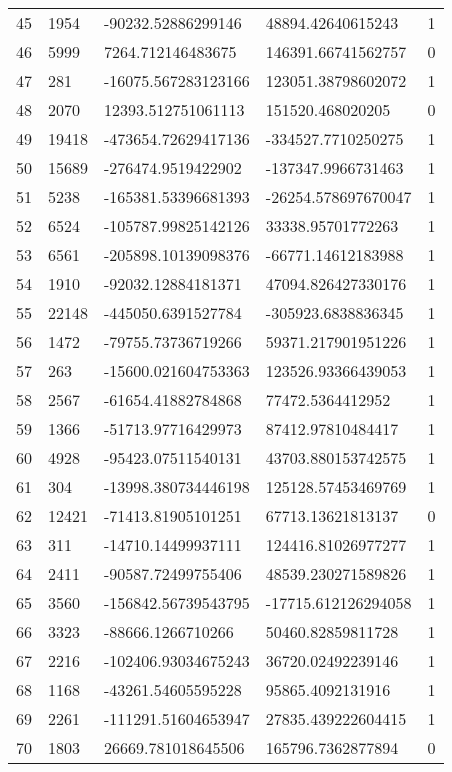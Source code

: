 \begin{longtable}{lllll}
    45 & 1954 & -90232.52886299146 & 48894.42640615243 & 1 \\
    46 & 5999 & 7264.712146483675 & 146391.66741562757 & 0 \\
    47 & 281 & -16075.567283123166 & 123051.38798602072 & 1 \\
    48 & 2070 & 12393.512751061113 & 151520.468020205 & 0 \\
    49 & 19418 & -473654.72629417136 & -334527.7710250275 & 1 \\
    50 & 15689 & -276474.9519422902 & -137347.9966731463 & 1 \\
    51 & 5238 & -165381.53396681393 & -26254.578697670047 & 1 \\
    52 & 6524 & -105787.99825142126 & 33338.95701772263 & 1 \\
    53 & 6561 & -205898.10139098376 & -66771.14612183988 & 1 \\
    54 & 1910 & -92032.12884181371 & 47094.826427330176 & 1 \\
    55 & 22148 & -445050.6391527784 & -305923.6838836345 & 1 \\
    56 & 1472 & -79755.73736719266 & 59371.217901951226 & 1 \\
    57 & 263 & -15600.021604753363 & 123526.93366439053 & 1 \\
    58 & 2567 & -61654.41882784868 & 77472.5364412952 & 1 \\
    59 & 1366 & -51713.97716429973 & 87412.97810484417 & 1 \\
    60 & 4928 & -95423.07511540131 & 43703.880153742575 & 1 \\
    61 & 304 & -13998.380734446198 & 125128.57453469769 & 1 \\
    62 & 12421 & -71413.81905101251 & 67713.13621813137 & 0 \\
    63 & 311 & -14710.14499937111 & 124416.81026977277 & 1 \\
    64 & 2411 & -90587.72499755406 & 48539.230271589826 & 1 \\
    65 & 3560 & -156842.56739543795 & -17715.612126294058 & 1 \\
    66 & 3323 & -88666.1266710266 & 50460.82859811728 & 1 \\
    67 & 2216 & -102406.93034675243 & 36720.02492239146 & 1 \\
    68 & 1168 & -43261.54605595228 & 95865.4092131916 & 1 \\
    69 & 2261 & -111291.51604653947 & 27835.439222604415 & 1 \\
    70 & 1803 & 26669.781018645506 & 165796.7362877894 & 0 \\

\end{longtable}
